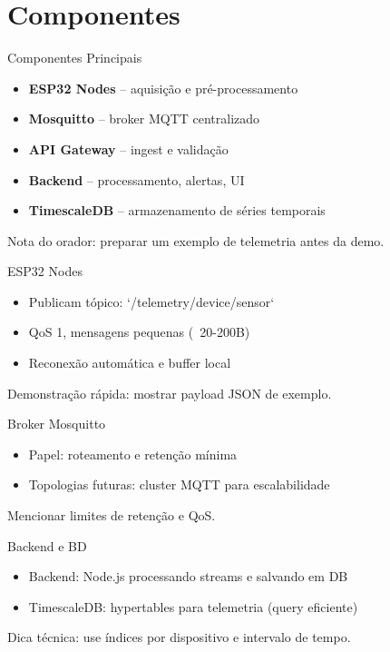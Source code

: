 \documentclass[11pt]{beamer}
\begin{document}
\section{Componentes}
\begin{frame}{Componentes Principais}
  \begin{itemize}
    \item \textbf{ESP32 Nodes} -- aquisição e pré-processamento
    \item \textbf{Mosquitto} -- broker MQTT centralizado
    \item \textbf{API Gateway} -- ingest e validação
    \item \textbf{Backend} -- processamento, alertas, UI
    \item \textbf{TimescaleDB} -- armazenamento de séries temporais
  \end{itemize}
  \vfill\footnotesize{Nota do orador: preparar um exemplo de telemetria antes da demo.}
\end{frame}

\begin{frame}{ESP32 Nodes}
  \begin{itemize}
    \item Publicam tópico: `/telemetry/{device}/sensor`
    \item QoS 1, mensagens pequenas (~20-200B)
    \item Reconexão automática e buffer local
  \end{itemize}
  \vfill\footnotesize{Demonstração rápida: mostrar payload JSON de exemplo.}
\end{frame}

\begin{frame}{Broker Mosquitto}
  \begin{itemize}
    \item Papel: roteamento e retenção mínima
    \item Topologias futuras: cluster MQTT para escalabilidade
  \end{itemize}
  \vfill\footnotesize{Mencionar limites de retenção e QoS.}
\end{frame}

\begin{frame}{Backend e BD}
  \begin{itemize}
    \item Backend: Node.js processando streams e salvando em DB
    \item TimescaleDB: hypertables para telemetria (query eficiente)
  \end{itemize}
  \vfill\footnotesize{Dica técnica: use índices por dispositivo e intervalo de tempo.}
\end{frame}
\end{document}
